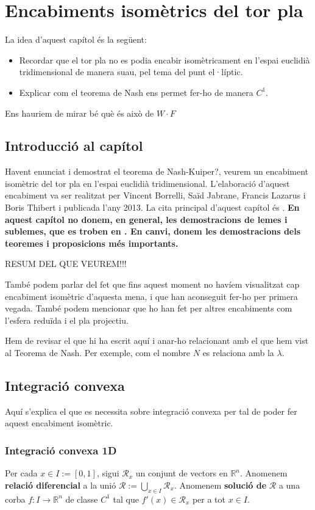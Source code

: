 \chapter{Encabiments isomètrics del tor pla}
{\color{blue}La idea d'aquest capítol és la següent:
\begin{itemize}
    \item Recordar que el tor pla no es podia encabir isomètricament en l'espai euclidià tridimensional de manera suau, pel tema del punt el·líptic.
    \item Explicar com el teorema de Nash ens permet fer-ho de manera $C^1$.
\end{itemize}

Ens hauriem de mirar bé què és això de $W\cdot F$
}
\section{Introducció al capítol}
Havent enunciat i demostrat el teorema de Nash{\color{blue}-Kuiper?}, veurem un encabiment isomètric del tor pla en l'espai euclidià tridimensional. L'elaboració d'aquest encabiment va ser realitzat per Vincent Borrelli, Saïd Jabrane, Francis Lazarus i Boris Thibert i publicada l'any 2013. La cita principal d'aquest capítol és \cite{borrelli2013}. \textbf{En aquest capítol no donem, en general, les demostracions de lemes i sublemes, que es troben en \cite{borrelli2013}. En canvi, donem les demostracions dels teoremes i proposicions més importants.}

{\color{blue} RESUM DEL QUE VEUREM!!!

També podem parlar del fet que fins aquest moment no havíem visualitzat cap encabiment isomètric d'aquesta mena, i que han aconseguit fer-ho per primera vegada. També podem mencionar que ho han fet per altres encabiments com l'esfera reduïda i el pla projectiu.

Hem de revisar el que hi ha escrit aquí i anar-ho relacionant amb el que hem vist al Teorema de Nash. Per exemple, com el nombre $N$ es relaciona amb la $\lambda$.}

\section{Integració convexa}
{\color{blue}Aquí s'explica el que es necessita sobre integració convexa per tal de poder fer aquest encabiment isomètric.}
\subsection{Integració convexa 1D}
\begin{defi}
    Per cada $x\in I := [0,1]$, sigui $\mathcal R_x$ un conjunt de vectors en $\mathbb R^n$. Anomenem \textbf{relació diferencial} a la unió $\mathcal R := \bigcup_{x\in I} \mathcal R_x$. Anomenem \textbf{solució de} $\mathcal R$ a una corba $f:I\to\mathbb R^n$ de classe $C^1$ tal que $f'(x)\in\mathcal R_x$ per a tot $x\in I$.
\end{defi}

